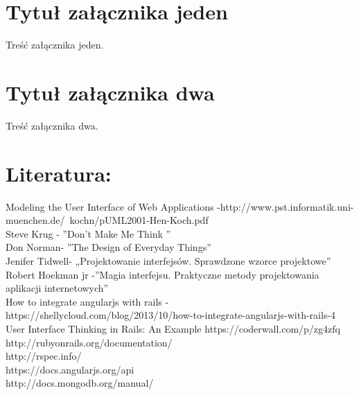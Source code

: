 \documentclass[brudnopis]{xmgr}
\begin{document}
\summary

\appendix
\chapter{Tytuł załącznika jeden}

Treść załącznika jeden.

\chapter{Tytuł załącznika dwa}

Treść załącznika dwa.




\chapter{Literatura:}
Modeling the User Interface of Web Applications -http://www.pst.informatik.uni-muenchen.de/~kochn/pUML2001-Hen-Koch.pdf\\
Steve Krug - ”Don't Make Me Think ”\\
Don Norman- ”The Design of Everyday Things”\\
Jenifer Tidwell- „Projektowanie interfejsów. Sprawdzone wzorce projektowe”\\
Robert Hoekman jr -”Magia interfejsu. Praktyczne metody projektowania aplikacji internetowych”\\
How to integrate angularjs with rails -https://shellycloud.com/blog/2013/10/how-to-integrate-angularjs-with-rails-4\\
User Interface Thinking in Rails: An Example https://coderwall.com/p/zg4zfq\\
http://rubyonrails.org/documentation/\\
http://rspec.info/\\
https://docs.angularjs.org/api\\
http://docs.mongodb.org/manual/\\


\listoftables

\listoffigures

\oswiadczenie
\end{document}
